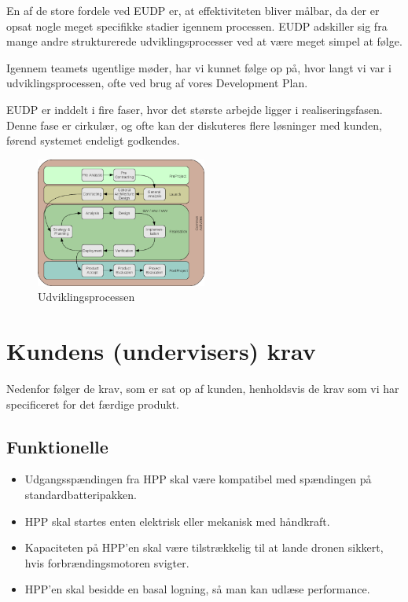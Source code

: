 En af de store fordele ved EUDP er, at effektiviteten bliver målbar, da der er opsat nogle meget specifikke stadier igennem processen. EUDP adskiller sig fra mange andre strukturerede udviklingsprocesser ved at være meget simpel at følge. 

Igennem teamets ugentlige møder, har vi kunnet følge op på, hvor langt vi var i udviklingsprocessen, ofte ved brug af vores Development Plan. 

EUDP er inddelt i fire faser, hvor det største arbejde ligger i realiseringsfasen. Denne fase er cirkulær, og ofte kan der diskuteres flere løsninger med kunden, førend systemet endeligt godkendes. 

\begin{figure}[h]
  \centering
  \includegraphics[width=0.5\textwidth]{./figurer/ij1.png}
  \caption[Udviklingsprocessen]{Udviklingsprocessen\protect\footnotemark}
  \label{fig:ij1}
\end{figure}

\section{Kundens (undervisers) krav}
\label{sec:kravsspecifikation-1}
Nedenfor følger de krav, som er sat op af kunden, henholdsvis de krav som vi har specificeret for det færdige produkt.


\subsection{Funktionelle}
\label{sec:funktionelle}

\begin{itemize}
\item Udgangsspændingen fra HPP skal være kompatibel med spændingen på standardbatteripakken.
\item HPP skal startes enten elektrisk eller mekanisk med håndkraft.
\item Kapaciteten på HPP’en skal være tilstrækkelig til at lande dronen sikkert, hvis forbrændingsmotoren svigter.
\item HPP’en skal besidde en basal logning, så man kan udlæse performance.
\end{itemize}

